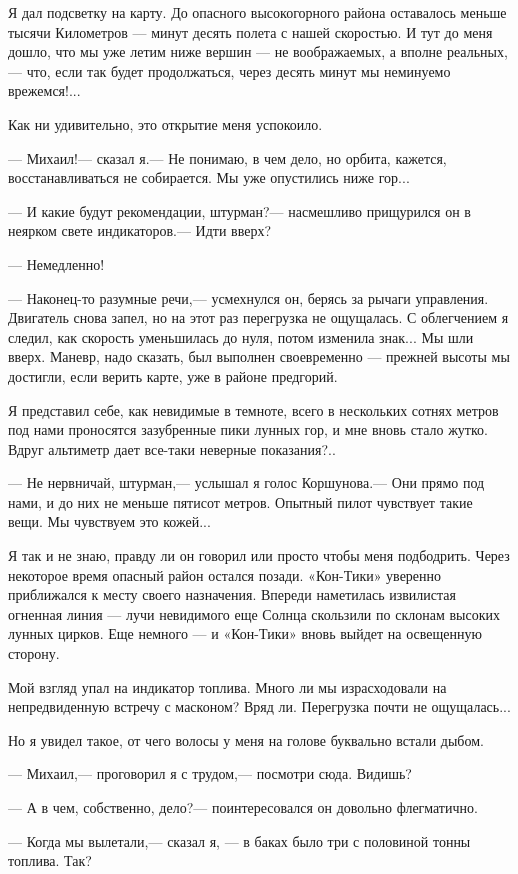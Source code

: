 \documentclass[11pt,a4paper,oneside]{article}
\begin{document}
Я дал подсветку на карту. До опасного высокогорного района оставалось меньше тысячи Километров — минут десять полета с нашей скоростью. И тут до меня дошло, что мы уже летим ниже вершин — не воображаемых, а вполне реальных,— что, если так будет продолжаться, через десять минут мы неминуемо врежемся!...

Как ни удивительно, это открытие меня успокоило.

— Михаил!— сказал я.— Не понимаю, в чем дело, но орбита, кажется, восстанавливаться не собирается. Мы уже опустились ниже гор...

— И какие будут рекомендации, штурман?— насмешливо прищурился он в неярком свете индикаторов.— Идти вверх?

— Немедленно!

— Наконец-то разумные речи,— усмехнулся он, берясь за рычаги управления. Двигатель снова запел, но на этот раз перегрузка не ощущалась. С облегчением я следил, как скорость уменьшилась до нуля, потом изменила знак... Мы шли вверх. Маневр, надо сказать, был выполнен своевременно — прежней высоты мы достигли, если верить карте, уже в районе предгорий.

Я представил себе, как невидимые в темноте, всего в нескольких сотнях метров под нами проносятся зазубренные пики лунных гор, и мне вновь стало жутко. Вдруг альтиметр дает все-таки неверные показания?..

— Не нервничай, штурман,— услышал я голос Коршунова.— Они прямо под нами, и до них не меньше пятисот метров. Опытный пилот чувствует такие вещи. Мы чувствуем это кожей...

Я так и не знаю, правду ли он говорил или просто чтобы меня подбодрить. Через некоторое время опасный район остался позади. «Кон-Тики» уверенно приближался к месту своего назначения. Впереди наметилась извилистая огненная линия — лучи невидимого еще Солнца скользили по склонам высоких лунных цирков. Еще немного — и «Кон-Тики» вновь выйдет на освещенную сторону.

Мой взгляд упал на индикатор топлива. Много ли мы израсходовали на непредвиденную встречу с масконом? Вряд ли. Перегрузка почти не ощущалась...

Но я увидел такое, от чего волосы у меня на голове буквально встали дыбом.

— Михаил,— проговорил я с трудом,— посмотри сюда. Видишь?

— А в чем, собственно, дело?— поинтересовался он довольно флегматично.

— Когда мы вылетали,— сказал я, — в баках было три с половиной тонны топлива. Так?
\end{document}
